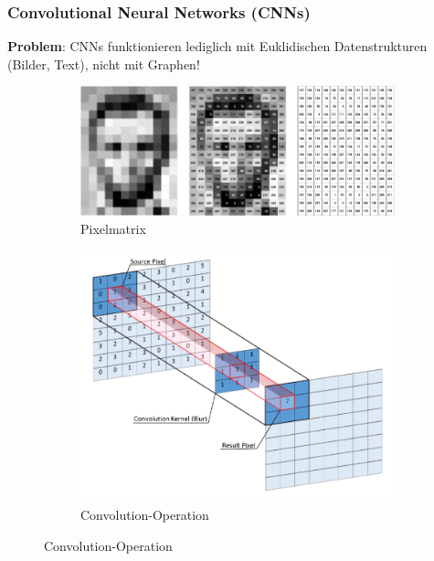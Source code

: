\documentclass{beamer}
\begin{document}
\begin{frame}
  \frametitle{Convolutional Neural Networks (CNNs)}
  \textbf{Problem}: CNNs funktionieren lediglich mit Euklidischen Datenstrukturen (Bilder, Text), nicht mit Graphen!
  
    \begin{figure}[H]
      \centering
      \begin{subfigure}[b]{0.49\textwidth}
        \centering
        \includegraphics[width=\textwidth]{img/pixelmatrix.png}
        \caption*{Pixelmatrix \cite{PixelMatrix}}
      \end{subfigure}
      \begin{subfigure}[b]{0.49\textwidth}
        \centering
        \includegraphics[width=\textwidth]{img/convolution.png}
        \caption*{Convolution-Operation \cite{Convolution}}
      \end{subfigure}
    \end{figure}
\end{frame}
\end{document}

